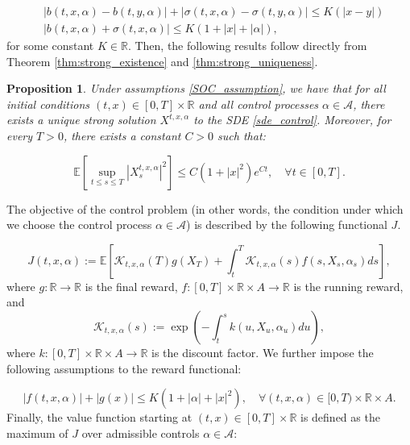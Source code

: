 \documentclass{article}
\newtheorem{prop}{Proposition}
\begin{document}
\begin{equation} \label{SOC_assumption}
\begin{aligned}
&|b(t,x,\alpha)-b(t,y,\alpha)|+|\sigma(t,x,\alpha)-\sigma(t,y,\alpha)|\leq K(|x-y|)\\
&|b(t,x,\alpha)+\sigma(t,x,\alpha)|\leq K(1+|x|+|\alpha|),
\end{aligned}
\end{equation}
for some constant $K\in\mathbb{R}$. Then, the following results follow directly from Theorem \eqref{thm:strong_existence} and \eqref{thm:strong_uniqueness}.

\begin{prop}
Under assumptions \eqref{SOC_assumption}, we have that for all initial conditions $(t,x)\in[0,T]\times\mathbb{R}$ and all control processes $\alpha\in\mathcal{A}$, there exists a unique strong solution $X^{t,x,\alpha}$ to the SDE \eqref{sde_control}. Moreover, for every $T>0$, there exists a constant $C>0$ such that:

\begin{equation*}
\mathbb{E}\left[\sup_{t\leq s\leq T}|X_s^{t,x,\alpha}|^2\right]\leq C(1+|x|^2)e^{Ct}, \quad \forall t\in[0,T].
\end{equation*}
\end{prop}

The objective of the control problem (in other words, the condition under which we choose the control process $\alpha\in\mathcal{A}$) is described by the following functional $J$. 

\begin{equation*}
J(t,x,\alpha):=\mathbb{E}\left[\mathcal{K}_{t,x,\alpha}(T)g(X_T)+\int^T_t\mathcal{K}_{t,x,\alpha}(s)f(s,X_s,\alpha_s)ds\right],
\end{equation*}
where $g:\mathbb{R}\rightarrow\mathbb{R}$ is the final reward, $f:[0,T]\times\mathbb{R}\times A\rightarrow\mathbb{R}$ is the running reward, and 
\begin{equation} \label{def_k}
\mathcal{K}_{t,x,\alpha}(s):=\exp(-\int^s_tk(u,X_u,\alpha_u)du),
\end{equation}
where $k:[0,T]\times\mathbb{R}\times A\rightarrow\mathbb{R}$ is the discount factor. We further impose the following assumptions to the reward functional:

\begin{equation*}
|f(t,x,\alpha)|+|g(x)|\leq K(1+|\alpha|+|x|^2), \quad \forall (t,x,\alpha)\in[0,T)\times\mathbb{R}\times A.
\end{equation*}
Finally, the value function starting at $(t,x)\in[0,T]\times\mathbb{R}$ is defined as the maximum of $J$ over admissible controls $\alpha\in\mathcal{A}$:
\end{document}
